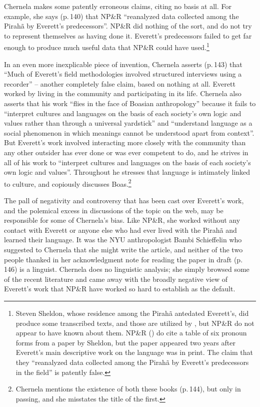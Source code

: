 \documentclass[output=paper,colorlinks,citecolor=brown
]{langscibook}
\begin{document}
Chernela makes some patently erroneous claims, citing no basis at all.
For example, she says (p.\,140) that NP\&R ``reanalyzed data collected
among the Pirahã by Everett's predecessors''. NP\&R did nothing of
the sort, and do not try to represent themselves as having done it.
Everett's predecessors failed to get far enough to produce much
useful data that NP\&R could have used.\footnote{%
   Steven Sheldon, whose residence among the Pirahã antedated
   Everett's, did produce some transcribed texts, and those are
   utilized by \citet{FutrellEtAl16}, but NP\&R do not appear to have
   known about them. NP\&R (\citeyear[391]{NevPesRod09a}) do cite a
   table of six pronoun forms from a paper by Sheldon, but the paper
   \citep{Sheldon88} appeared two years after Everett's main
   descriptive work on the language was in print. The claim that they
   ``reanalyzed data collected among the Pirahã by Everett's
   predecessors in the field'' is patently false.}

\begin{sloppypar}
In an even more inexplicable piece of invention, Chernela asserts
(p.\,143) that ``Much of Everett's field methodologies involved
structured interviews using a recorder'' -- another completely false
claim, based on nothing at all. Everett worked by living in the
community and participating in its life. Chernela also asserts that
his work ``flies in the face of Boasian anthropology'' because it fails
to ``interpret cultures and languages on the basis of each society's
own logic and values rather than through a universal yardstick'' and
``understand language as a social phenomenon in which meanings cannot
be understood apart from context''. But Everett's work involved
interacting more closely with the community than any other outsider
has ever done or was ever competent to do, and he strives in all of
his work to ``interpret cultures and languages on the basis of each
society's own logic and values''. Throughout \citet{Everett12} he
stresses that language is intimately linked to culture, and
\citet{Everett16} copiously discusses Boas.\footnote{%
   Chernela mentions the existence of both these books (p.\,144), but
   only in passing, and she misstates the title of the first.}
\end{sloppypar}

The pall of negativity and controversy that has been cast over
Everett's work, and the polemical excess in discussions of the topic
on the web, may be responsible for some of Chernela's bias. Like
NP\&R, she worked without any contact with Everett or anyone else
who had ever lived with the Pirahã and learned their language.
It was the NYU anthropologist Bambi Schieffelin who suggested to
Chernela that she might write the article, and neither of the two
people thanked in her acknowledgment note for reading the paper in
draft (p.\,146) is a linguist. Chernela does no linguistic analysis;
she simply browsed some of the recent literature and came away with
the broadly negative view of Everett's work that NP\&R have worked
so hard to establish as the default.
\end{document}
